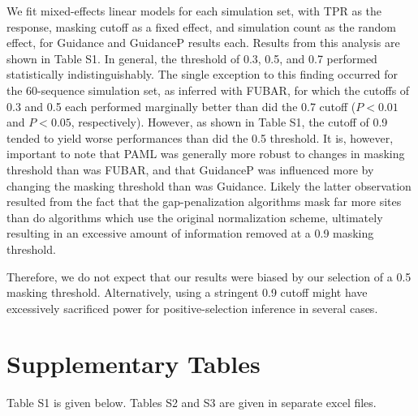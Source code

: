 \documentclass[11pt]{article}
\begin{document}
We fit mixed-effects linear models for each simulation set, with TPR as the response, masking cutoff as a fixed effect, and simulation count as the random effect, for Guidance and GuidanceP results each. Results from this analysis are shown in Table S1. In general, the threshold of 0.3, 0.5, and 0.7 performed statistically indistinguishably. The single exception to this finding occurred for the 60-sequence simulation set, as inferred with FUBAR, for which the cutoffs of 0.3 and 0.5 each performed marginally better than did the 0.7 cutoff ($P < 0.01$ and $P < 0.05$, respectively). However, as shown in Table S1, the cutoff of 0.9 tended to yield worse performances than did the 0.5 threshold. It is, however, important to note that PAML was generally more robust to changes in masking threshold than was FUBAR, and that GuidanceP was influenced more by changing the masking threshold than was Guidance. Likely the latter observation resulted from the fact that the gap-penalization algorithms mask far more sites than do algorithms which use the original normalization scheme, ultimately resulting in an excessive amount of information removed at a 0.9 masking threshold.

Therefore, we do not expect that our results were biased by our selection of a 0.5 masking threshold. Alternatively, using a stringent 0.9 cutoff might have excessively sacrificed power for positive-selection inference in several cases. 

\newpage

	

\newpage
\section{Supplementary Tables}

Table S1 is given below. Tables S2 and S3 are given in separate excel files. 
\bigskip
\bigskip
\bigskip
\bigskip
\end{document}
